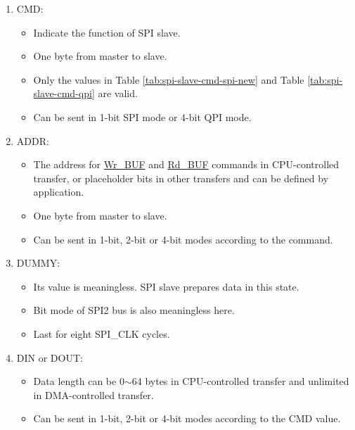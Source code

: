 \documentclass[main\_\_EN.tex]{subfiles}
\begin{document}
\begin{enumerate}
   \item CMD:
        \begin{itemize}
            \item Indicate the function of SPI slave.
            \item One byte from master to slave.
            \item Only the values in Table \ref{tab:spi-slave-cmd-spi-new} and Table \ref{tab:spi-slave-cmd-qpi} are valid.
            \item Can be sent in 1-bit SPI mode or 4-bit QPI mode.
        \end{itemize}

   \item ADDR:
        \begin{itemize}
            \item The address for  \hyperlink{cmd:wrbuf}{Wr\_BUF} and  \hyperlink{cmd:rdbuf}{Rd\_BUF} commands in CPU-controlled transfer, or placeholder bits in other transfers and can be defined by application.
            \item One byte from master to slave.
            \item Can be sent in 1-bit, 2-bit or 4-bit modes according to the command.
        \end{itemize}

   \item DUMMY:
        \begin{itemize}
            \item Its value is meaningless. SPI slave prepares data in this state.
            \item Bit mode of SPI2 bus is also meaningless here.
            \item Last for eight SPI\_CLK cycles.
        \end{itemize}

   \item DIN or DOUT:

        \begin{itemize}
            \item Data length can be 0$\sim$64 bytes in CPU-controlled transfer and unlimited in DMA-controlled transfer.
            \item Can be sent in 1-bit, 2-bit or 4-bit modes according to the CMD value.
        \end{itemize}

   \end{enumerate}
\end{document}
